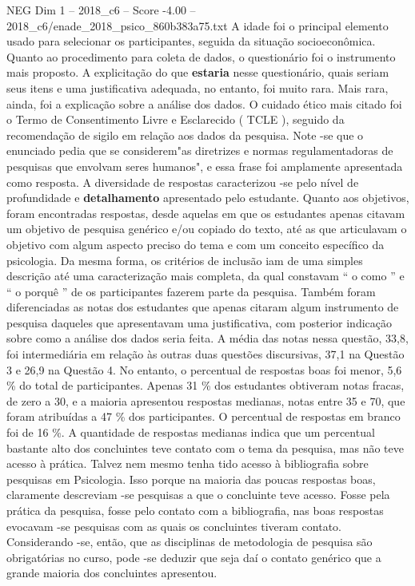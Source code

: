 \begin{textsample}{NEG Dim 1 – 2018\_c6 – Score -4.00 – 2018\_c6/enade\_2018\_psico\_860b383a75.txt}
A idade foi o principal elemento usado para selecionar os participantes, seguida da situação socioeconômica.
Quanto ao procedimento para coleta de dados, o questionário foi o instrumento mais proposto.
A explicitação do que \textbf{estaria} nesse questionário, quais seriam seus itens e uma justificativa adequada, no entanto, foi muito rara.
Mais rara, ainda, foi a explicação sobre a análise dos dados.
O cuidado ético mais citado foi o Termo de Consentimento Livre e Esclarecido ( TCLE ), seguido da recomendação de sigilo em relação aos dados da pesquisa.
Note -se que o enunciado pedia que se considerem"as diretrizes e normas regulamentadoras de pesquisas que envolvam seres humanos", e essa frase foi amplamente apresentada como resposta.
A diversidade de respostas caracterizou -se pelo nível de profundidade e \textbf{detalhamento} apresentado pelo estudante.
Quanto aos objetivos, foram encontradas respostas, desde aquelas em que os estudantes apenas citavam um objetivo de pesquisa genérico e/ou copiado do texto, até as que articulavam o objetivo com algum aspecto preciso do tema e com um conceito específico da psicologia.
Da mesma forma, os critérios de inclusão iam de uma simples descrição até uma caracterização mais completa, da qual constavam “ o como ” e “ o porquê ” de os participantes fazerem parte da pesquisa.
Também foram diferenciadas as notas dos estudantes que apenas citaram algum instrumento de pesquisa daqueles que apresentavam uma justificativa, com posterior indicação sobre como a análise dos dados seria feita.
A média das notas nessa questão, 33,8, foi intermediária em relação às outras duas questões discursivas, 37,1 na Questão 3 e 26,9 na Questão 4.
No entanto, o percentual de respostas boas foi menor, 5,6 \% do total de participantes.
Apenas 31 \% dos estudantes obtiveram notas fracas, de zero a 30, e a maioria apresentou respostas medianas, notas entre 35 e 70, que foram atribuídas a 47 \% dos participantes.
O percentual de respostas em branco foi de 16 \%.
A quantidade de respostas medianas indica que um percentual bastante alto dos concluintes teve contato com o tema da pesquisa, mas não teve acesso à prática.
Talvez nem mesmo tenha tido acesso à bibliografia sobre pesquisas em Psicologia.
Isso porque na maioria das poucas respostas boas, claramente descreviam -se pesquisas a que o concluinte teve acesso.
Fosse pela prática da pesquisa, fosse pelo contato com a bibliografia, nas boas respostas evocavam -se pesquisas com as quais os concluintes tiveram contato.
Considerando -se, então, que as disciplinas de metodologia de pesquisa são obrigatórias no curso, pode -se deduzir que seja daí o contato genérico que a grande maioria dos concluintes apresentou.

\end{textsample}
